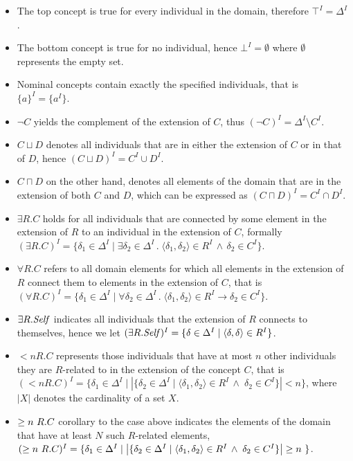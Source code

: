 \begin{itemize}
  \item The top concept is true for every individual in the domain, therefore $\top^I = \Delta^I$.
  \item The bottom concept is true for no individual, hence $\bot^I = \emptyset$ where $\emptyset$ represents the empty set.
  \item Nominal concepts contain exactly the specified individuals, that is $\{ a \}^I = \{ a^I \}$.
  \item $\lnot C$ yields the complement of the extension of $C$, thus $(\lnot C)^I = \Delta^I \setminus C^I$.
  \item $C \sqcup D$ denotes all individuals that are in either the extension of $C$ or in that of $D$, hence $(C \sqcup D)^I = C^I \cup D^I$.
  \item $C \sqcap D$ on the other hand, denotes all elements of the domain that are in the extension of both $C$ and $D$, which can be expressed as $(C \sqcap D)^I = C^I \cap D^I$.
  \item $\exists R.C$ holds for all individuals that are connected by some element in the extension of $R$ to an individual in the extension of $C$, formally $(\exists R.C)^I = \{ \delta_1 \in \Delta^I \mid \exists \delta_2 \in \Delta^I \, . \; \langle \delta_1, \delta_2 \rangle \in R^I \, \land \, \delta_2 \in C^I  \}$.
  \item $\forall R.C$ refers to all domain elements for which all elements in the extension of $R$ connect them to elements in the extension of $C$, that is $(\forall R.C)^I = \{ \delta_1 \in \Delta^I \mid \forall \delta_2 \in \Delta^I \, . \; \langle \delta_1, \delta_2 \rangle \in R^I \to \delta_2 \in C^I \}$.
  \item $\exists R.\mathit{Self}$ indicates all individuals that the extension of $R$ connects to themselves, hence we let $(\exists R.\mathit{Self})^I = \{ \delta \in \Delta^I \mid \langle \delta, \delta \rangle \in R^I\}$.
  \item $\less n R.C$ represents those individuals that have at most $n$ other individuals they are $R$-related to in the extension of the concept $C$, that is  $(\less n R.C)^I = \{ \delta_1 \in \Delta^I \mid \left| \{ \delta_2 \in \Delta^I \mid \langle \delta_1, \delta_2 \rangle \in R^I \, \land \; \delta_2 \in C^I \} \right| \less n \}$, where $|X|$ denotes the cardinality of a set $X$.
  \item $\geq n~R.C$ corollary to the case above indicates the elements of the domain that have at least $N$ such $R$-related elements, \\$(\geq n~R.C)^I = \{ \delta_1 \in \Delta^I \mid \left| \{ \delta_2 \in \Delta^I \mid \langle \delta_1, \delta_2 \rangle \in R^I \, \land \; \delta_2 \in C^I \} \right| \geq n~\}$.
\end{itemize}

